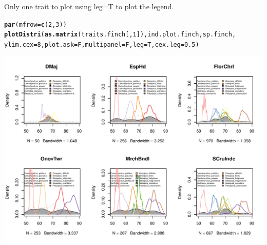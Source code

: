 \documentclass[12pt]{article}\usepackage[]{graphicx}\usepackage[]{color}
\makeatletter
\def\maxwidth{ %
  \ifdim\Gin@nat@width>\linewidth
    \linewidth
  \else
    \Gin@nat@width
  \fi
}
\newcommand{\hlnum}[1]{\textcolor[rgb]{0.686,0.059,0.569}{#1}}%
\newcommand{\hlstd}[1]{\textcolor[rgb]{0.345,0.345,0.345}{#1}}%
\newcommand{\hlkwc}[1]{\textcolor[rgb]{0.333,0.667,0.333}{#1}}%
\newcommand{\hlkwd}[1]{\textcolor[rgb]{0.737,0.353,0.396}{\textbf{#1}}}%
\newenvironment{kframe}{%
 \def\at@end@of@kframe{}%
 \ifinner\ifhmode%
  \def\at@end@of@kframe{\end{minipage}}%
  \begin{minipage}{\columnwidth}%
 \fi\fi%
 \def\FrameCommand##1{\hskip\@totalleftmargin \hskip-\fboxsep
 \colorbox{shadecolor}{##1}\hskip-\fboxsep
     \hskip-\linewidth \hskip-\@totalleftmargin \hskip\columnwidth}%
 \MakeFramed {\advance\hsize-\width
   \@totalleftmargin\z@ \linewidth\hsize
   \@setminipage}}%
 {\par\unskip\endMakeFramed%
 \at@end@of@kframe}
\newenvironment{knitrout}{}{} %
\makeatother
\begin{document}
\begin{knitrout}
\end{knitrout}

Only one trait to plot using leg=T to plot the legend.

\begin{knitrout}
\color{fgcolor}\begin{kframe}
\begin{alltt}
\hlkwd{par}\hlstd{(}\hlkwc{mfrow}\hlstd{=}\hlkwd{c}\hlstd{(}\hlnum{2}\hlstd{,}\hlnum{3}\hlstd{))}
\hlkwd{plotDistri}\hlstd{(}\hlkwd{as.matrix}\hlstd{(traits.finch[,}\hlnum{1}\hlstd{]), ind.plot.finch, sp.finch,}
          \hlkwc{ylim.cex}\hlstd{=}\hlnum{8}\hlstd{,} \hlkwc{plot.ask}\hlstd{=F,} \hlkwc{multipanel}\hlstd{=F,} \hlkwc{leg}\hlstd{=T,} \hlkwc{cex.leg}\hlstd{=}\hlnum{0.5}\hlstd{)}
\end{alltt}
\end{kframe}
\includegraphics[width=\maxwidth]{figure/unnamed-chunk-12} 

\end{knitrout}
\end{document}
